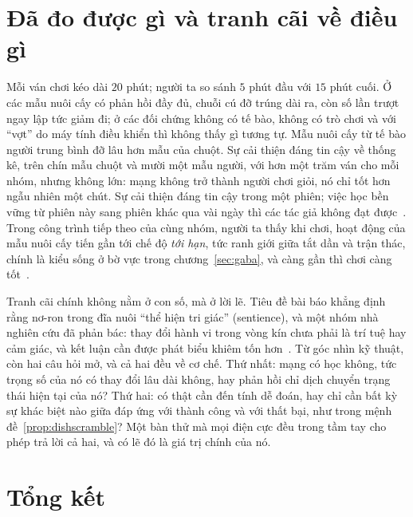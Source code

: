 \section{Đã đo được gì và tranh cãi về điều gì}

Mỗi ván chơi kéo dài $20$ phút; người ta so sánh $5$ phút đầu với $15$ phút cuối. Ở các mẫu nuôi cấy có phản hồi đầy đủ, chuỗi cú đỡ trúng dài ra, còn số lần trượt ngay lập tức giảm đi; ở các đối chứng không có tế bào, không có trò chơi và với ``vợt'' do máy tính điều khiển thì không thấy gì tương tự. Mẫu nuôi cấy từ tế bào người trung bình đỡ lâu hơn mẫu của chuột. Sự cải thiện đáng tin cậy về thống kê, trên chín mẫu chuột và mười một mẫu người, với hơn một trăm ván cho mỗi nhóm, nhưng không lớn: mạng không trở thành người chơi giỏi, nó chỉ tốt hơn ngẫu nhiên một chút. Sự cải thiện đáng tin cậy trong một phiên; việc học bền vững từ phiên này sang phiên khác qua vài ngày thì các tác giả không đạt được~\cite{Kagan2022}. Trong công trình tiếp theo của cùng nhóm, người ta thấy khi chơi, hoạt động của mẫu nuôi cấy tiến gần tới chế độ \emph{tới hạn}, tức ranh giới giữa tắt dần và trận thác, chính là kiểu sống ở bờ vực trong chương~\ref{sec:gaba}, và càng gần thì chơi càng tốt~\cite{Habibollahi2023}.

Tranh cãi chính không nằm ở con số, mà ở lời lẽ. Tiêu đề bài báo khẳng định rằng nơ-ron trong đĩa nuôi ``thể hiện tri giác'' (sentience), và một nhóm nhà nghiên cứu đã phản bác: thay đổi hành vi trong vòng kín chưa phải là trí tuệ hay cảm giác, và kết luận cần được phát biểu khiêm tốn hơn~\cite{Balci2023}. Từ góc nhìn kỹ thuật, còn hai câu hỏi mở, và cả hai đều về cơ chế. Thứ nhất: mạng có học không, tức trọng số của nó có thay đổi lâu dài không, hay phản hồi chỉ dịch chuyển trạng thái hiện tại của nó? Thứ hai: có thật cần đến tính dễ đoán, hay chỉ cần bất kỳ sự khác biệt nào giữa đáp ứng với thành công và với thất bại, như trong mệnh đề~\ref{prop:dishscramble}? Một bàn thử mà mọi điện cực đều trong tầm tay cho phép trả lời cả hai, và có lẽ đó là giá trị chính của nó.



\section{Tổng kết}

